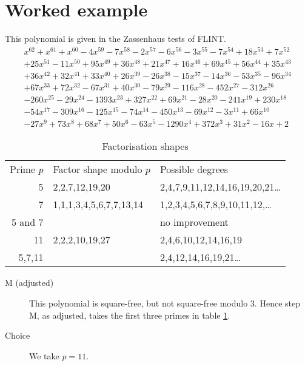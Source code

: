 \documentclass{llncs}
\begin{document}
\section{Worked example}
This polynomial is given in the Zassenhaus tests of FLINT.
\begin{equation}
\begin{array}{l}
x^{62}+x^{61}+x^{60}-4 x^{59}-7 x^{58}-2 x^{57}-6 x^{56}-3 x^{55}-7 x^{54}+18 x^{53}+7 x^{52}\\+25 x^{51}-11 x^{50}+95 x^{49}+36 x^{48}+21 x^{47}+16 x^{46}+69 x^{45}+56 x^{44}+35 x^{43}\\+36 x^{42}+32 x^{41}+33 x^{40}+26 x^{39}-26 x^{38}-15 x^{37}-14 x^{36}-53 x^{35}-96 x^{34}\\+67 x^{33}+72 x^{32}-67 x^{31}+40 x^{30}-79 x^{29}-116 x^{28}-452 x^{27}-312 x^{26}\\-260 x^{25}-29 x^{24}-1393 x^{23}+327 x^{22}+69 x^{21}-28 x^{20}-241 x^{19}+230 x^{18}\\-54 x^{17}-309 x^{16}-125 x^{15}-74 x^{14}-450 x^{13}-69 x^{12}-3 x^{11}+66 x^{10}\\-27 x^{9}+73 x^{8}+68 x^{7}+50 x^{6}-63 x^{5}-1290 x^{4}+372 x^{3}+31 x^{2}-16 x +2
\end{array}
\end{equation}
\begin{table}
\caption{Factorisation shapes\label{tab:CZ}}
\begin{tabular}{rll}
Prime $p$\quad&Factor shape modulo $p$&Possible degrees\\
5&2,2,7,12,19,20&2,4,7,9,11,12,14,16,19,20,21\dots\\
7&1,1,1,3,4,5,6,7,7,13,14&1,2,3,4,5,6,7,8,9,10,11,12,\dots\\
5 and 7&&no improvement\\
11&2,2,2,10,19,27&2,4,6,10,12,14,16,19\\
5,7,11&&2,4,12,14,16,19,21\dots
\end{tabular}
\end{table}
\begin{description}
\item[M (adjusted)]
This polynomial is square-free, but not square-free modulo 3. Hence step M, as adjusted, takes the first three primes in table \ref{tab:CZ}.
\item[Choice]We take $p=11$. 
\end{description}
\end{document}
